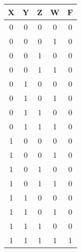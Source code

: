 \begin{tabular}{|c|c|c|c||c|}
\hline
X & Y & Z & W & F \\

    
        \hline
    
  
  
  0 & 0 & 0 & 0 & 0 \\

    
  
  
  0 & 0 & 0 & 1 & 0 \\

    
  
  
  0 & 0 & 1 & 0 & 0 \\

    
  
  
  0 & 0 & 1 & 1 & 0 \\

    
        \hline
    
  
  
  0 & 1 & 0 & 0 & 0 \\

    
  
  
  0 & 1 & 0 & 1 & 0 \\

    
  
  
  0 & 1 & 1 & 0 & 0 \\

    
  
  
  0 & 1 & 1 & 1 & 0 \\

    
        \hline
    
  
  
  1 & 0 & 0 & 0 & 0 \\

    
  
  
  1 & 0 & 0 & 1 & 0 \\

    
  
  
  1 & 0 & 1 & 0 & 0 \\

    
  
  
  1 & 0 & 1 & 1 & 0 \\

    
        \hline
    
  
  
  1 & 1 & 0 & 0 & 0 \\

    
  
  
  1 & 1 & 0 & 1 & 0 \\

    
  
  
  1 & 1 & 1 & 0 & 0 \\

    
  
  
  1 & 1 & 1 & 1 & 1 \\

\hline
\end{tabular}


